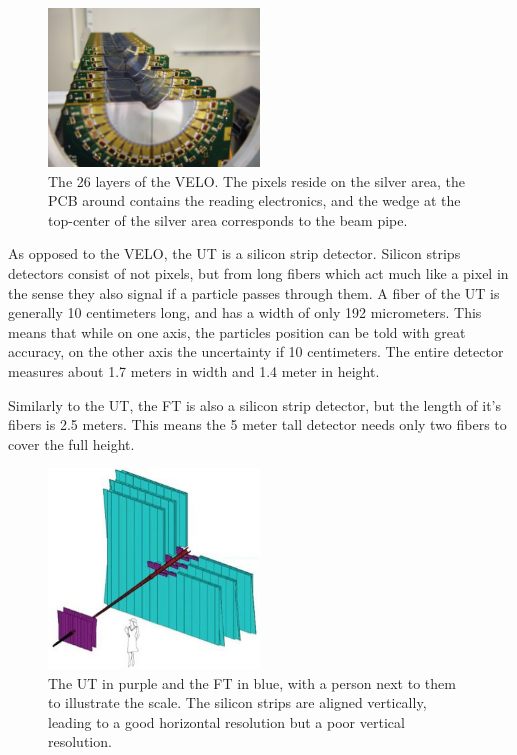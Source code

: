 \documentclass[12pt]{article}
\begin{document}
\begin{figure}[H]
	\begin{center}
		\includegraphics[width=0.5\textwidth]{detector_velo_real}
	\end{center}
	\caption{The 26 layers of the VELO. The pixels reside on the silver area, the PCB around contains the reading electronics, and the wedge at the top-center of the silver area corresponds to the beam pipe.}
	\label{fig_detector_velo_real}
\end{figure}

As opposed to the VELO, the UT is a silicon strip detector. Silicon strips detectors consist of not pixels, but from long fibers which act much like a pixel in the sense they also signal if a particle passes through them. A fiber of the UT is generally 10 centimeters long, and has a width of only 192 micrometers. This means that while on one axis, the particles position can be told with great accuracy, on the other axis the uncertainty if 10 centimeters. The entire detector measures about 1.7 meters in width and 1.4 meter in height.

Similarly to the UT, the FT is also a silicon strip detector, but the length of it's fibers is 2.5 meters. This means the 5 meter tall detector needs only two fibers to cover the full height.

\begin{figure}[H]
	\begin{center}
		\includegraphics[width=0.5\textwidth]{detector_ut_ft_drawing}
	\end{center}
	\caption{The UT in purple and the FT in blue, with a person next to them to illustrate the scale. The silicon strips are aligned vertically, leading to a good horizontal resolution but a poor vertical resolution.}
	\label{fig_detector_ut_ft_drawing}
\end{figure}
\end{document}
